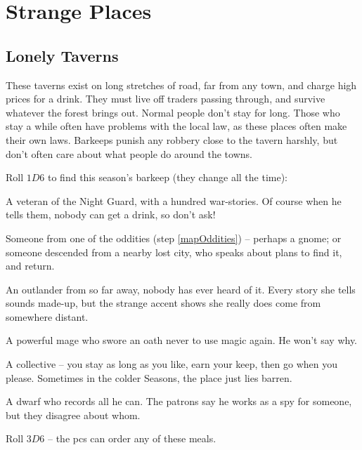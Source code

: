 \section{Strange Places}

\begin{multicols}{2}

\subsection{Lonely Taverns}
\label{lonelyTaverns}

These taverns exist on long stretches of road, far from any town, and
charge high prices for a drink. They must live off traders passing
through, and survive whatever the forest brings out. Normal people don't
stay for long. Those who stay a while often have problems with the local
law, as these places often make their own laws. Barkeeps punish any
robbery close to the tavern harshly, but don't often care about what
people do around the towns.


Roll $1D6$ to find this season's barkeep (they change all the time):

\begin{dlist}
\item
  A veteran of the Night Guard, with a hundred war-stories. Of course
  when he tells them, nobody can get a drink, so don't ask!
\item
  Someone from one of the oddities (step \ref{mapOddities}) -- perhaps a gnome; or someone descended from a nearby lost city, who speaks about plans to find it, and return.
\item
  An outlander from so far away, nobody has ever heard of it. Every
  story she tells sounds made-up, but the strange accent shows she really
  does come from somewhere distant.
\item
  A powerful mage who swore an oath never to use magic again. He won't
  say why.
\item
  A collective -- you stay as long as you like, earn your keep, then go
  when you please. Sometimes in the colder Seasons, the place just lies
  barren.
\item
  A dwarf who records all he can. The patrons say he works as a spy for
  someone, but they disagree about whom.
\end{dlist}


Roll $3D6$ -- the \glspl{pc} can order any of these meals.


\end{multicols}
